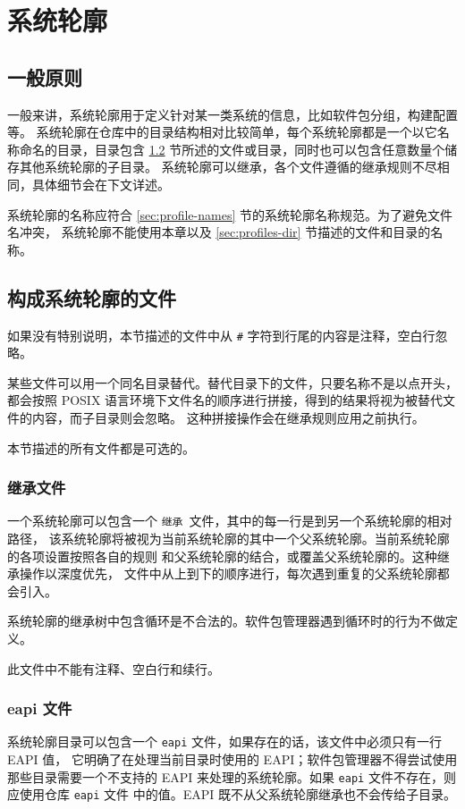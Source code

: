 \chapter{系统轮廓}
\label{ch:profiles}

\section{一般原则}
一般来讲，系统轮廓用于定义针对某一类系统的信息，比如软件包分组，构建配置等。
系统轮廓在仓库中的目录结构相对比较简单，每个系统轮廓都是一个以它名称命名的目录，目录包含
\ref{sec:profile-files} 节所述的文件或目录，同时也可以包含任意数量个储存其他系统轮廓的子目录。
系统轮廓可以继承，各个文件遵循的继承规则不尽相同，具体细节会在下文详述。

系统轮廓的名称应符合 \ref{sec:profile-names} 节的系统轮廓名称规范。为了避免文件名冲突，
系统轮廓不能使用本章以及 \ref{sec:profiles-dir} 节描述的文件和目录的名称。

\section{构成系统轮廓的文件}
\label{sec:profile-files}
如果没有特别说明，本节描述的文件中从 \texttt{\#} 字符到行尾的内容是注释，空白行忽略。

某些文件可以用一个同名目录替代。替代目录下的文件，只要名称不是以点开头，都会按照 POSIX
语言环境下文件名的顺序进行拼接，得到的结果将视为被替代文件的内容，而子目录则会忽略。
这种拼接操作会在继承规则应用之前执行。

本节描述的所有文件都是可选的。

\subsection{继承文件}
一个系统轮廓可以包含一个 \texttt{继承}\ 文件，其中的每一行是到另一个系统轮廓的相对路径，
该系统轮廓将被视为当前系统轮廓的其中一个父系统轮廓。当前系统轮廓的各项设置按照各自的规则
和父系统轮廓的结合，或覆盖父系统轮廓的。这种继承操作以深度优先，
文件中从上到下的顺序进行，每次遇到重复的父系统轮廓都会引入。

系统轮廓的继承树中包含循环是不合法的。软件包管理器遇到循环时的行为不做定义。

此文件中不能有注释、空白行和续行。

\subsection{eapi 文件}
系统轮廓目录可以包含一个 \texttt{eapi} 文件，如果存在的话，该文件中必须只有一行 EAPI 值，
它明确了在处理当前目录时使用的 EAPI；软件包管理器不得尝试使用那些目录需要一个不支持的
EAPI 来处理的系统轮廓。如果 \texttt{eapi} 文件不存在，则应使用仓库 \texttt{eapi} 文件
中的值。EAPI 既不从父系统轮廓继承也不会传给子目录。

